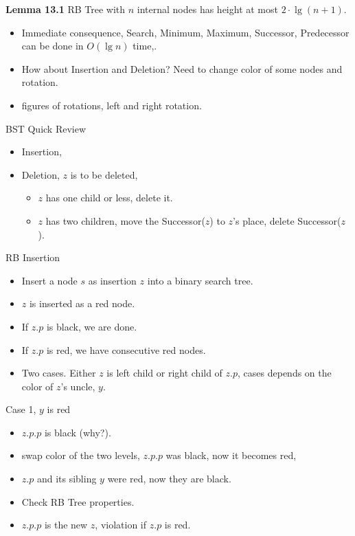 \documentclass{beamer}
\begin{document}
\begin{frame}{}

{\bf Lemma 13.1 } RB Tree with $n$ internal nodes has height at most $2\cdot \lg(n+1)$.
\begin{itemize}
\item Immediate consequence, {\sc Search}, {\sc Minimum}, {\sc Maximum}, {\sc Successor}, {\sc Predecessor} can be done in $O(\lg n)$ time,. 
\item How about {\sc Insertion} and {\sc Deletion}? Need to change color of some nodes and rotation. 
\item figures of rotations, left and right rotation. 
\end{itemize}
\end{frame}

\begin{frame}{BST Quick Review}

\begin{itemize}
\item Insertion, 
\item Deletion, $z$ is to be deleted, 
\begin{itemize}
\item $z$ has one child or less, delete it. 
\item $z$ has two children, move the {\sc Successor($z$)} to $z$'s place, delete {\sc Successor($z$)}. 
\end{itemize}
\end{itemize}
\end{frame}

\begin{frame}{RB Insertion}

\begin{itemize}
\item Insert a node $s$ as insertion $z$ into a binary search tree. 
\item $z$ is inserted as a red node. 
\item If $z.p$ is black, we are done. 
\item If $z.p$ is red, we have consecutive red nodes. 
\item Two cases. Either $z$ is left child or right child of $z.p$, cases depends on the color of $z$'s uncle, $y$.
\end{itemize}
\end{frame}

\begin{frame}{Case 1, $y$ is red}

\begin{itemize}
\item $z.p.p$ is black (why?). 
\item swap color of the two levels, $z.p.p$  was black, now it becomes red,
\item $z.p$ and its sibling $y$ were red, now they are black. 
\item Check RB Tree properties. 
\item $z.p.p$ is the new $z$, violation if $z.p$ is red. 
\end{itemize}
\end{frame}
\end{document}
